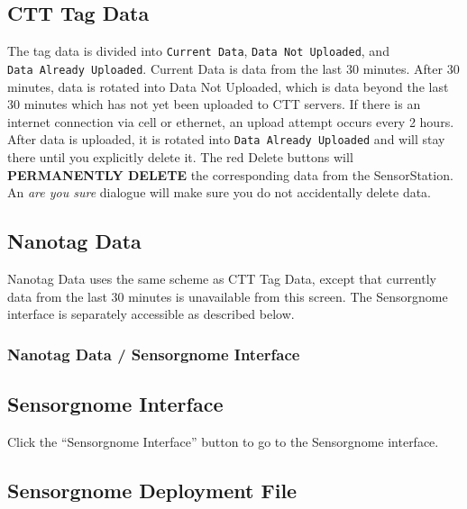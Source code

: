\documentclass[
]{article}
\begin{document}
\hypertarget{ctt-tag-data}{%
\subsection{CTT Tag Data}\label{ctt-tag-data}}

The tag data is divided into \texttt{Current\ Data},
\texttt{Data\ Not\ Uploaded}, and \texttt{Data\ Already\ Uploaded}.
Current Data is data from the last 30 minutes. After 30 minutes, data is
rotated into Data Not Uploaded, which is data beyond the last 30 minutes
which has not yet been uploaded to CTT servers. If there is an internet
connection via cell or ethernet, an upload attempt occurs every 2 hours.
After data is uploaded, it is rotated into
\texttt{Data\ Already\ Uploaded} and will stay there until you
explicitly delete it. The red Delete buttons will \textbf{PERMANENTLY
DELETE} the corresponding data from the SensorStation. An \emph{are you
sure} dialogue will make sure you do not accidentally delete data.

\hypertarget{nanotag-data}{%
\subsection{Nanotag Data}\label{nanotag-data}}

Nanotag Data uses the same scheme as CTT Tag Data, except that currently
data from the last 30 minutes is unavailable from this screen. The
Sensorgnome interface is separately accessible as described below.

\hypertarget{nanotag-data-sensorgnome-interface}{%
\subsubsection{Nanotag Data / Sensorgnome
Interface}\label{nanotag-data-sensorgnome-interface}}

\hypertarget{sensorgnome-interface}{%
\subsection{Sensorgnome Interface}\label{sensorgnome-interface}}

Click the ``Sensorgnome Interface'' button to go to the Sensorgnome
interface.

\hypertarget{sensorgnome-deployment-file}{%
\subsection{Sensorgnome Deployment
File}\label{sensorgnome-deployment-file}}
\end{document}
